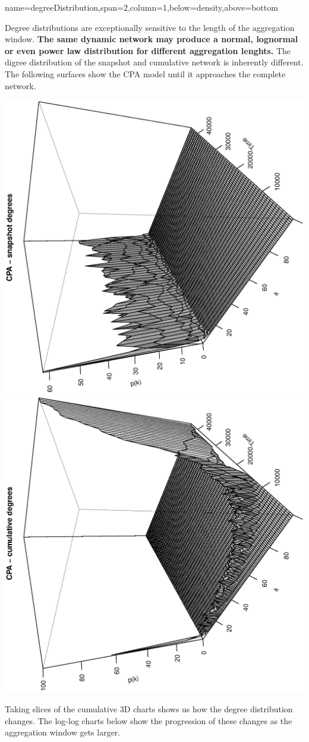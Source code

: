 \documentclass[a0paper,portrait]{baposter}
\begin{document}
\begin{poster}
{name=degreeDistribution,span=2,column=1,below=density,above=bottom}{
Degree distributions are exceptionally sensitive to the length of the aggregation window. \textbf{The same dynamic network may produce a normal, lognormal or even power law distribution for different aggregation lenghts.} The digree distribution of the snapshot and cumulative network is inherently different. The following surfaces show the CPA model until it approaches the complete network.
\vspace{-0.2em}
\begin{center}
	\includegraphics[angle=-90,width=0.49\linewidth]{CPA_3d_snapshot}
	\includegraphics[angle=-90,width=0.49\linewidth]{CPA_3d_cumulative}
\end{center}
\vspace{-0.2em}
Taking slices of the cumulative 3D charts shows us how the degree distribution changes. The log-log charts below show the progression of these changes as the aggregation window gets larger.
\vspace{-0.2em}
\begin{center}

\end{center}}
\end{poster}
\end{document}
